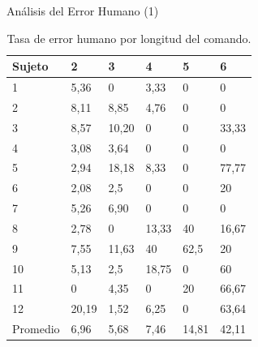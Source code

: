 \begin{frame}{An\'alisis del Error Humano (1)}
\begin{table}[H]
\centering
\footnotesize
\begin{tabular}{|p{1.2cm}|p{1.0cm}|p{1.0cm}|p{1.0cm}|p{1.0cm}|p{1.0cm}|}
\hline
    Sujeto & 2 & 3 & 4 & 5 & 6  \\
    \hline 
    1 & 5,36   & 0     & 3,33  &0   &0 \\
    2 & 8,11   & 8,85  & 4,76  &0   &0 \\
    3 & 8,57   & 10,20 & 0 &  0  &33,33 \\
    4 & 3,08   & 3,64 & 0  & 0  & 0 \\
    5 & 2,94   & 18,18 & 8,33 &  0 & 77,77 \\
    6 & 2,08   & 2,5 & 0 & 0 & 20 \\
    7 & 5,26   & 6,90 & 0 & 0 & 0 \\
    8 & 2,78   & 0 & 13,33 & 40 & 16,67 \\
    9 & 7,55   & 11,63 & 40  &  62,5  & 20 \\
    10 & 5,13  & 2,5  & 18,75  &  0 & 60 \\
    11 & 0     & 4,35 & 0 & 20 & 66,67 \\
    12 & 20,19 & 1,52 & 6,25 & 0  & 63,64 \\
    \hline 
    Promedio & 6,96 & 5,68 & 7,46 & 14,81 & 42,11 \\
\hline
\end{tabular}
\caption{Tasa de error humano por longitud del comando.}
\label{sec:error-longitud}
\end{table}

\end{frame}

